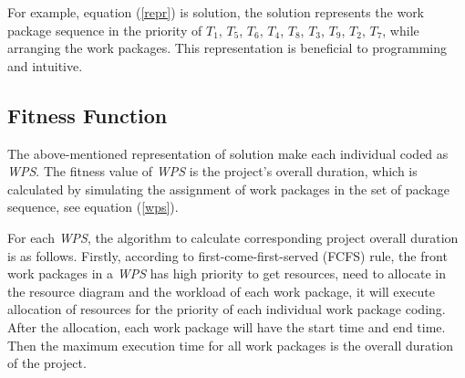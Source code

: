 For example, equation (\ref{repr}) is solution, the solution represents the work
package sequence in the priority of $T_1$, $T_5$, $T_6$, $T_4$, $T_8$, $T_3$,
$T_9$, $T_2$, $T_7$, while arranging the work packages. This representation is
beneficial to programming and intuitive.


\subsection{Fitness Function}
%
The above-mentioned representation of solution make each individual coded as
\emph{WPS}. The fitness value of \emph{WPS} is the project's overall duration,
which is calculated by simulating the assignment of work packages in the set of
package sequence, see equation (\ref{wps}).

For each \emph{WPS}, the algorithm to calculate corresponding project overall
duration is as follows. Firstly, according to first-come-first-served (FCFS)
rule, the front work packages in a \emph{WPS} has high priority to get
resources, need to allocate in the resource diagram and the workload of each
work package, it will execute allocation of resources for the priority of each
individual work package coding. After the allocation, each work package will
have the start time and end time. Then the maximum execution time for all work
packages is the overall duration of the project.

